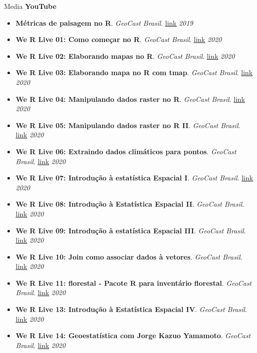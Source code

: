 \documentclass{resume}
\begin{document}
\begin{rSection}{Media}
{\bf YouTube}
\begin{itemize} 
\item {\bf Métricas de paisagem no R}. {\it GeoCast Brasil}. \href{https://youtu.be/RCTrLx_33D8}{\underline{link}} \hfill{\em 2019}
\item {\bf We R Live 01: Como começar no R}. {\it GeoCast Brasil}. \href{https://youtu.be/ZORFVdwtJ1U}{\underline{link}} \hfill{\em 2020}
\item {\bf We R Live 02: Elaborando mapas no R}. {\it GeoCast Brasil}. \href{https://youtu.be/eHht0n3Ppcg}{\underline{link}} \hfill{\em 2020}
\item {\bf We R Live 03: Elaborando mapa no R com tmap}. {\it GeoCast Brasil}. \href{https://youtu.be/BmlM25XQ3QA}{\underline{link}} \hfill{\em 2020}
\item {\bf We R Live 04: Manipulando dados raster no R}. {\it GeoCast Brasil}. \href{https://youtu.be/dFC9SuGLuX8}{\underline{link}} \hfill{\em 2020}
\item {\bf We R Live 05: Manipulando dados raster no R II}. {\it GeoCast Brasil}. \href{https://youtu.be/AKJo_Q0dsMI}{\underline{link}} \hfill{\em 2020}
\item {\bf We R Live 06: Extraindo dados climáticos para pontos}. {\it GeoCast Brasil}. \href{https://youtu.be/-_ODMFDU6ck}{\underline{link}} \hfill{\em 2020}
\item {\bf We R Live 07: Introdução à estatística Espacial I}. {\it GeoCast Brasil}. \href{https://youtu.be/fHWD4qyKj84}{\underline{link}} \hfill{\em 2020}
\item {\bf We R Live 08: Introdução à Estatística Espacial II}. {\it GeoCast Brasil}. \href{https://youtu.be/BCl_V-SpQec}{\underline{link}} \hfill{\em 2020}
\item {\bf We R Live 09: Introdução à estatística Espacial III}. {\it GeoCast Brasil}. \href{https://youtu.be/eaR7pTsQFDQ}{\underline{link}} \hfill{\em 2020}
\item {\bf We R Live 10: Join como associar dados à vetores}. {\it GeoCast Brasil}. \href{https://youtu.be/BvURukaIDM0}{\underline{link}} \hfill{\em 2020}
\item {\bf We R Live 11: florestal - Pacote R para inventário florestal}. {\it GeoCast Brasil}. \href{https://youtu.be/xOgsVywKADI}{\underline{link}} \hfill{\em 2020}
\item {\bf We R Live 13: Introdução à Estatística Espacial IV}. {\it GeoCast Brasil}. \href{https://youtu.be/IsOJvaWdyXE}{\underline{link}} \hfill{\em 2020}
\item {\bf We R Live 14: Geoestatística com Jorge Kazuo Yamamoto}. {\it GeoCast Brasil}. \href{https://youtu.be/BvURukaIDM0}{\underline{link}} \hfill{\em 2020}

\end{itemize}
\end{rSection}
\end{document}
